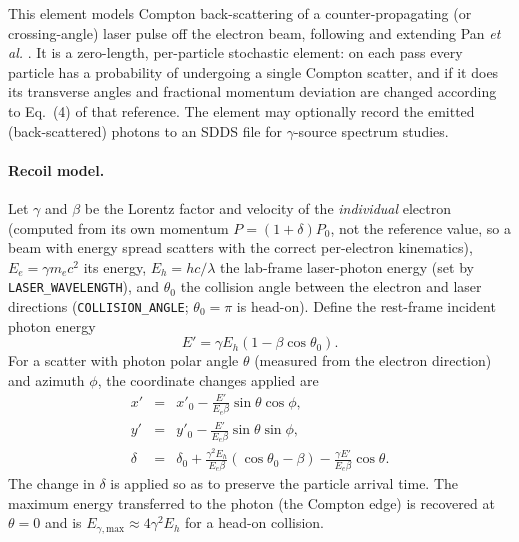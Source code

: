 This element models Compton back-scattering of a counter-propagating (or crossing-angle) laser pulse off the electron
beam, following and extending Pan {\em et al.}  \cite{PhysRevAccelBeams.22.040702}.  It is a zero-length, per-particle
stochastic element: on each pass every particle has a probability of undergoing a single Compton scatter, and if it does
its transverse angles and fractional momentum deviation are changed according to Eq.~(4) of that reference.  The element
may optionally record the emitted (back-scattered) photons to an SDDS file for $\gamma$-source spectrum studies.

\paragraph{Recoil model.}
Let $\gamma$ and $\beta$ be the Lorentz factor and velocity of the {\em individual}
electron (computed from its own momentum $P=(1+\delta)P_0$, not the reference
value, so a beam with energy spread scatters with the correct per-electron
kinematics), $E_e=\gamma m_e c^2$ its energy, $E_h = h c/\lambda$ the lab-frame
laser-photon energy (set by \verb|LASER_WAVELENGTH|), and $\theta_0$ the collision
angle between the electron and laser directions (\verb|COLLISION_ANGLE|;
$\theta_0=\pi$ is head-on).  Define the rest-frame incident photon energy
\begin{equation}
E' = \gamma E_h (1 - \beta\cos\theta_0).
\end{equation}
For a scatter with photon polar angle $\theta$ (measured from the electron
direction) and azimuth $\phi$, the coordinate changes applied are
\begin{eqnarray}
x' &=& x'_0 - \frac{E'}{E_e\beta}\sin\theta\cos\phi, \\
y' &=& y'_0 - \frac{E'}{E_e\beta}\sin\theta\sin\phi, \\
\delta &=& \delta_0 + \frac{\gamma^2 E_h}{E_e\beta}(\cos\theta_0-\beta)
                    - \frac{\gamma E'}{E_e\beta}\cos\theta .
\end{eqnarray}
The change in $\delta$ is applied so as to preserve the particle arrival time.
The maximum energy transferred to the photon (the Compton edge) is recovered at
$\theta=0$ and is $E_{\gamma,\mathrm{max}}\approx 4\gamma^2 E_h$ for a head-on
collision.

